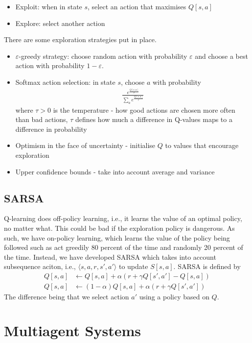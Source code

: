 \documentclass[a4paper]{article}
\theoremstyle{plain}
\theoremstyle{definition}
\theoremstyle{remark}
\begin{document}
 \begin{itemize}
 	\item Exploit: when in state $s$, select an action that maximises $Q[s,a]$ 
	\item Explore: select another action
 \end{itemize}
 There are some exploration strategies put in place. 
 \begin{itemize}
 	\item $\varepsilon$-greedy strategy: choose random action with probability $\varepsilon$ and choose a best action with probability $1-\varepsilon$.
	\item Softmax action selection: in state $s$, choose $a$ with probability
		\begin{align*}
			\frac{e^{\frac{Q[s,a]}{\tau}}}{\sum_{a}^{} e^{\frac{Q[s,a]}{\tau}}}
		\end{align*}
	where $\tau >0$ is the temperature - how good actions are chosen more often than bad actions, $\tau$ defines how much a difference in Q-values maps to a difference in probability
\item Optimism in the face of uncertainty - initialise  $Q$ to values that encourage exploration
\item Upper confidence bounds - take into account average and variance
 \end{itemize}
 \subsection{SARSA}
 
 Q-learning does off-policy learning, i.e., it learns the value of an optimal policy, no matter what. This could be bad if the exploration policy is dangerous. As such, we have on-policy learning, which learns the value of the policy being followed such as act greedily 80 percent of the time and randomly 20 percent of the time. Instead, we have developed SARSA which takes into account subsequence aciton, i.e., $\langle s,a,r,s',a' \rangle$ to update $S[s,a]$. SARSA is defined by
 \begin{align*}
	 Q[s,a] &\leftarrow Q[s,a] + \alpha(r+\gamma Q[s',a'] - Q[s,a]) \\
Q[s,a] &\leftarrow (1-\alpha)Q[s,a] + \alpha(r+\gamma Q[s',a'])
 \end{align*}
 The difference being that we select action $a'$ using a policy based on $Q$.
 \section{Multiagent Systems}
\end{document}
